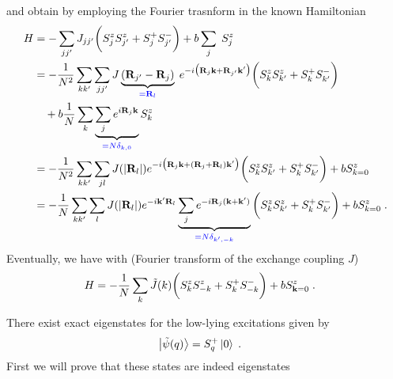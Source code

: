 and obtain by employing the Fourier trasnform in the known Hamiltonian
%
\begin{align*}
H &= -\sum_{jj'} J_{jj'} \bigg(S_{j}^{z}S_{j'}^{z}+S_{j}^{+}S_{j'}^{-}\bigg)
+ b \sum_{j} \;S_{j}^{z}\\
&= -\frac{1}{N^{2}}\sum_{kk'} \sum_{jj'} J\underbrace{
(\mathbf R_{j'}-\mathbf R_{j})
}_{\color{blue} = \mathbf R_{l}}\; e^{-i \big(\mathbf R_{j} \mathbf k+\mathbf R_{j'} \mathbf k'\big)}\bigg(S_{k}^{z}S_{k'}^{z}+S_{k}^{+}S_{k'}^{-}\bigg)\\
&\quad+b\frac{1}{N}\sum_{k}
\underbrace{ 
\sum_{j} e^{i \mathbf R_{j} \mathbf k} 
}_{\color{blue} = N\delta_{k,0}} S_{k}^{z}\\
&= -\frac{1}{N^{2}}\sum_{kk'} \sum_{jl} J(|\mathbf R_{l}|) e^{-i \big(\mathbf R_{j} \mathbf k+(\mathbf R_{j}+\mathbf R_{l}) \mathbf k'\big)}\bigg(S_{k}^{z}S_{k'}^{z}+S_{k}^{+}S_{k'}^{-}\bigg)
+b  S_{k=0}^{z}\\
&= -\frac{1}{N}\sum_{kk'} \sum_{l} J(|\mathbf R_{l}|) 
e^{-i \mathbf k' \mathbf R_{l}}\underbrace{
\sum_{j}
e^{-i \mathbf R_{j} (\mathbf k+ \mathbf k')}
}_{\color{blue} = N\delta_{k',-k}}\bigg(S_{k}^{z}S_{k'}^{z}+S_{k}^{+}S_{k'}^{-}\bigg)
+b  S_{k=0}^{z}\;.
\end{align*}
%
Eventually, we have with  (Fourier transform of the exchange coupling $J$)
%
\begin{align}\label{eq:Heisenberg:Fourier}
H
&= -\frac{1}{N} \sum_{k} \tilde J(k)
\bigg(S_{k}^{z}S_{-k}^{z}+S_{k}^{+}S_{-k}^{-}\bigg)
+b  S_{\mathbf k=0}^{z}\;.
\end{align}


There exist exact eigenstates for the low-lying excitations  given by
%
\begin{align}\label{eq:}
\ket{\tilde \psi(q)} &= S_{q}^{+} \ket{0}\;.
\end{align}
%
First  we will prove that these states are indeed eigenstates

